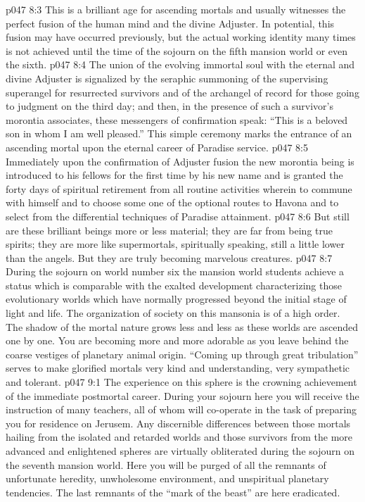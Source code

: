\pc \vs p047 8:3 This is a brilliant age for ascending mortals and usually witnesses the perfect fusion of the human mind and the divine Adjuster. In potential, this fusion may have occurred previously, but the actual working identity many times is not achieved until the time of the sojourn on the fifth mansion world or even the sixth.\plusone
\pc \vs p047 8:4 The union of the evolving immortal soul with the eternal and divine Adjuster is signalized by the seraphic summoning of the supervising superangel for resurrected survivors and of the archangel of record for those going to judgment on the third day; and then, in the presence of such a survivor’s morontia associates, these messengers of confirmation speak: “This is a beloved son in whom I am well pleased.” This simple ceremony marks the entrance of an ascending mortal upon the eternal career of Paradise service.
\vs p047 8:5 Immediately upon the confirmation of Adjuster fusion the new morontia being is introduced to his fellows for the first time by his new name and is granted the forty days of spiritual retirement from all routine activities wherein to commune with himself and to choose some one of the optional routes to Havona and to select from the differential techniques of Paradise attainment.
\pc \vs p047 8:6 But still are these brilliant beings more or less material; they are far from being true spirits; they are more like supermortals, spiritually speaking, still a little lower than the angels. But they are truly becoming marvelous creatures.
\vs p047 8:7 During the sojourn on world number six the mansion world students achieve a status which is comparable with the exalted development characterizing those evolutionary worlds which have normally progressed beyond the initial stage of light and life. The organization of society on this mansonia is of a high order. The shadow of the mortal nature grows less and less as these worlds are ascended one by one. You are becoming more and more adorable as you leave behind the coarse vestiges of planetary animal origin. “Coming up through great tribulation” serves to make glorified mortals very kind and understanding, very sympathetic and tolerant.
\vs p047 9:1 The experience on this sphere is the crowning achievement of the immediate postmortal career. During your sojourn here you will receive the instruction of many teachers, all of whom will co\hyp{}operate in the task of preparing you for residence on Jerusem. Any discernible differences between those mortals hailing from the isolated and retarded worlds and those survivors from the more advanced and enlightened spheres are virtually obliterated during the sojourn on the seventh mansion world. Here you will be purged of all the remnants of unfortunate heredity, unwholesome environment, and unspiritual planetary tendencies. The last remnants of the “mark of the beast” are here eradicated.
